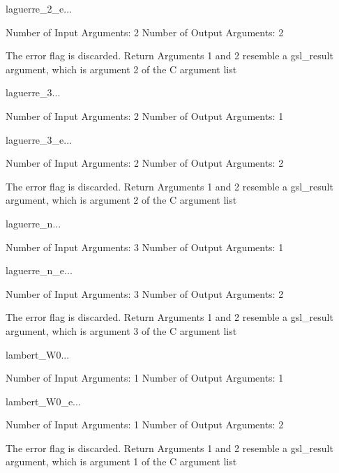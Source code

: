 \begin{funcdesc}{laguerre_2_e}{...}

    Number of Input  Arguments:  2
    Number of Output Arguments:  2

The error flag is discarded.
Return Arguments 1 and 2 resemble a gsl_result argument,
	which is  argument 2 of the C argument list

\end{funcdesc}

\begin{funcdesc}{laguerre_3}{...}

    Number of Input  Arguments:  2
    Number of Output Arguments:  1
\end{funcdesc}

\begin{funcdesc}{laguerre_3_e}{...}

    Number of Input  Arguments:  2
    Number of Output Arguments:  2

The error flag is discarded.
Return Arguments 1 and 2 resemble a gsl_result argument,
	which is  argument 2 of the C argument list

\end{funcdesc}

\begin{funcdesc}{laguerre_n}{...}

    Number of Input  Arguments:  3
    Number of Output Arguments:  1
\end{funcdesc}

\begin{funcdesc}{laguerre_n_e}{...}

    Number of Input  Arguments:  3
    Number of Output Arguments:  2

The error flag is discarded.
Return Arguments 1 and 2 resemble a gsl_result argument,
	which is  argument 3 of the C argument list

\end{funcdesc}

\begin{funcdesc}{lambert_W0}{...}

    Number of Input  Arguments:  1
    Number of Output Arguments:  1
\end{funcdesc}

\begin{funcdesc}{lambert_W0_e}{...}

    Number of Input  Arguments:  1
    Number of Output Arguments:  2

The error flag is discarded.
Return Arguments 1 and 2 resemble a gsl_result argument,
	which is  argument 1 of the C argument list

\end{funcdesc}

